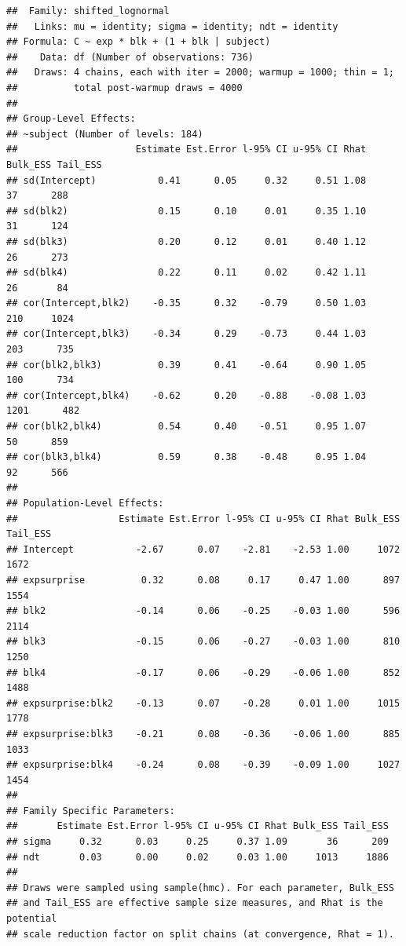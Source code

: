 \documentclass[
]{article}
\begin{document}
\begin{verbatim}
##  Family: shifted_lognormal 
##   Links: mu = identity; sigma = identity; ndt = identity 
## Formula: C ~ exp * blk + (1 + blk | subject) 
##    Data: df (Number of observations: 736) 
##   Draws: 4 chains, each with iter = 2000; warmup = 1000; thin = 1;
##          total post-warmup draws = 4000
## 
## Group-Level Effects: 
## ~subject (Number of levels: 184) 
##                     Estimate Est.Error l-95% CI u-95% CI Rhat Bulk_ESS Tail_ESS
## sd(Intercept)           0.41      0.05     0.32     0.51 1.08       37      288
## sd(blk2)                0.15      0.10     0.01     0.35 1.10       31      124
## sd(blk3)                0.20      0.12     0.01     0.40 1.12       26      273
## sd(blk4)                0.22      0.11     0.02     0.42 1.11       26       84
## cor(Intercept,blk2)    -0.35      0.32    -0.79     0.50 1.03      210     1024
## cor(Intercept,blk3)    -0.34      0.29    -0.73     0.44 1.03      203      735
## cor(blk2,blk3)          0.39      0.41    -0.64     0.90 1.05      100      734
## cor(Intercept,blk4)    -0.62      0.20    -0.88    -0.08 1.03     1201      482
## cor(blk2,blk4)          0.54      0.40    -0.51     0.95 1.07       50      859
## cor(blk3,blk4)          0.59      0.38    -0.48     0.95 1.04       92      566
## 
## Population-Level Effects: 
##                  Estimate Est.Error l-95% CI u-95% CI Rhat Bulk_ESS Tail_ESS
## Intercept           -2.67      0.07    -2.81    -2.53 1.00     1072     1672
## expsurprise          0.32      0.08     0.17     0.47 1.00      897     1554
## blk2                -0.14      0.06    -0.25    -0.03 1.00      596     2114
## blk3                -0.15      0.06    -0.27    -0.03 1.00      810     1250
## blk4                -0.17      0.06    -0.29    -0.06 1.00      852     1488
## expsurprise:blk2    -0.13      0.07    -0.28     0.01 1.00     1015     1778
## expsurprise:blk3    -0.21      0.08    -0.36    -0.06 1.00      885     1033
## expsurprise:blk4    -0.24      0.08    -0.39    -0.09 1.00     1027     1454
## 
## Family Specific Parameters: 
##       Estimate Est.Error l-95% CI u-95% CI Rhat Bulk_ESS Tail_ESS
## sigma     0.32      0.03     0.25     0.37 1.09       36      209
## ndt       0.03      0.00     0.02     0.03 1.00     1013     1886
## 
## Draws were sampled using sample(hmc). For each parameter, Bulk_ESS
## and Tail_ESS are effective sample size measures, and Rhat is the potential
## scale reduction factor on split chains (at convergence, Rhat = 1).
\end{verbatim}
\end{document}
